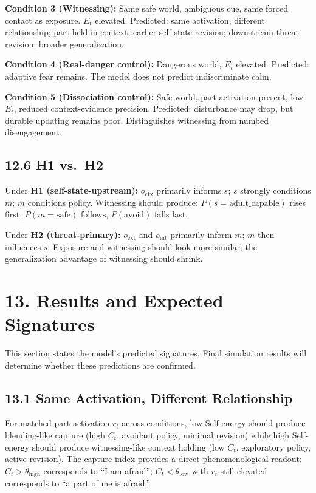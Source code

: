 \documentclass[11pt]{article}
\begin{document}
\textbf{Condition 3 (Witnessing):} Same safe world, ambiguous cue, same
forced contact as exposure. \(E_t\) elevated. Predicted: same
activation, different relationship; part held in context; earlier
self-state revision; downstream threat revision; broader generalization.

\textbf{Condition 4 (Real-danger control):} Dangerous world, \(E_t\)
elevated. Predicted: adaptive fear remains. The model does not predict
indiscriminate calm.

\textbf{Condition 5 (Dissociation control):} Safe world, part activation
present, low \(E_t\), reduced context-evidence precision. Predicted:
disturbance may drop, but durable updating remains poor. Distinguishes
witnessing from numbed disengagement.

\subsection{12.6 H1 vs.~H2}\label{h1-vs.-h2}

Under \textbf{H1 (self-state-upstream):} \(o_{\text{ctx}}\) primarily
informs \(s\); \(s\) strongly conditions \(m\); \(m\) conditions policy.
Witnessing should produce: \(P(s = \text{adult\_capable})\) rises first,
\(P(m = \text{safe})\) follows, \(P(\text{avoid})\) falls last.

Under \textbf{H2 (threat-primary):} \(o_{\text{ext}}\) and
\(o_{\text{int}}\) primarily inform \(m\); \(m\) then influences \(s\).
Exposure and witnessing should look more similar; the generalization
advantage of witnessing should shrink.

\section{13. Results and Expected
Signatures}\label{results-and-expected-signatures}

This section states the model's predicted signatures. Final simulation
results will determine whether these predictions are confirmed.

\subsection{13.1 Same Activation, Different
Relationship}\label{same-activation-different-relationship}

For matched part activation \(r_t\) across conditions, low Self-energy
should produce blending-like capture (high \(C_t\), avoidant policy,
minimal revision) while high Self-energy should produce witnessing-like
context holding (low \(C_t\), exploratory policy, active revision). The
capture index provides a direct phenomenological readout:
\(C_t > \theta_{\text{high}}\) corresponds to ``I am afraid'';
\(C_t < \theta_{\text{low}}\) with \(r_t\) still elevated corresponds to
``a part of me is afraid.''
\end{document}
